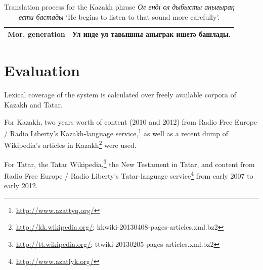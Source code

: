 \documentclass[11pt]{article}
\newcommand{\tag}[1]{{\small{\texttt{#1}}}}
\newcommand{\eng}[1]{`#1'}
\begin{document}
\begin{table}[htbp]
\begin{tabular}{ll}
\midrule
{\bf Mor. generation} & Ул инде ул тавышны аныграк ишетә башлады. \\
\bottomrule
\end{tabular}
 \caption{Translation process for the Kazakh phrase \emph{Ол енді ол дыбысты анығырақ ести бастады} \eng{He begins to listen to that sound more carefully}.}
\end{table}

\section{Evaluation}
\label{sec:eval}

Lexical coverage of the system is calculated over freely available corpora of Kazakh and Tatar.

For Kazakh, two years worth of content (2010 and 2012) from Radio Free Europe / Radio Liberty's Kazakh-language service,\footnote{\url{http://www.azattyq.org/}} as well as a recent dump of Wikipedia's articles in Kazakh\footnote{\url{http://kk.wikipedia.org/}; {\smallertt kkwiki-20130408-pages-articles.xml.bz2}} were used.

For Tatar, the Tatar Wikipedia,\footnote{\url{http://tt.wikipedia.org/}; {\smallertt ttwiki-20130205-pages-articles.xml.bz2}} the New Testament in Tatar, and content from Radio Free Europe / Radio Liberty's Tatar-language service\footnote{\url{http://www.azatlyk.org/}} from early 2007 to early 2012.

\end{document}
